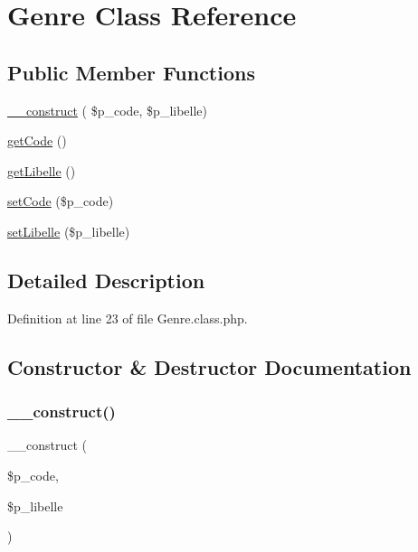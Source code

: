 \hypertarget{class_genre}{}\section{Genre Class Reference}
\label{class_genre}
\subsection*{Public Member Functions}
\begin{DoxyCompactItemize}
\item 
\hyperlink{class_genre_a883ff7d036bd064f0e2a182b3016b757}{\+\_\+\+\_\+construct} ( \$p\+\_\+code, \$p\+\_\+libelle)
\item 
\hyperlink{class_genre_ab5e24da53b4a0d0848b18c1e832f47ff}{get\+Code} ()
\item 
\hyperlink{class_genre_a72694073dfa7e02d433daa7eeb194fcc}{get\+Libelle} ()
\item 
\hyperlink{class_genre_a86ff2b38ba8118efc9c18d4b9e552ffb}{set\+Code} (\$p\+\_\+code)
\item 
\hyperlink{class_genre_a66db92fb0941d80c8abb47511455f856}{set\+Libelle} (\$p\+\_\+libelle)
\end{DoxyCompactItemize}


\subsection{Detailed Description}


Definition at line 23 of file Genre.\+class.\+php.



\subsection{Constructor \& Destructor Documentation}
\mbox{\label{class_genre_a883ff7d036bd064f0e2a182b3016b757}} 
\subsubsection{\texorpdfstring{\+\_\+\+\_\+construct()}{\_\_construct()}}
{\footnotesize\ttfamily \+\_\+\+\_\+construct (\begin{DoxyParamCaption}\item[{}]{\$p\+\_\+code,  }\item[{}]{\$p\+\_\+libelle }\end{DoxyParamCaption})}

